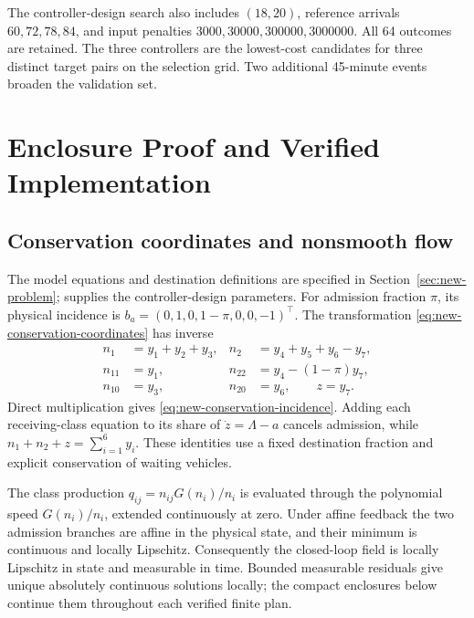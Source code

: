 The controller-design search also includes $(18,20)$, reference arrivals
$60,72,78,84$, and input penalties $3000,30000,300000,3000000$.
All 64 outcomes are retained. The three controllers are the lowest-cost candidates for three
distinct target pairs on the selection grid. Two additional 45-minute
events broaden the validation set.

\section{Enclosure Proof and Verified Implementation}
\label{app:new-enclosure-proof}

\subsection{Conservation coordinates and nonsmooth flow}

The model equations and destination definitions are specified in
Section~\ref{sec:new-problem};  supplies the controller-design
parameters. For admission fraction $\pi$, its physical incidence is
$b_a=(0,1,0,1-\pi,0,0,-1)^\top$. The transformation
\eqref{eq:new-conservation-coordinates} has inverse
\begin{equation}
 \begin{aligned}
 n_1&=y_1+y_2+y_3,&
 n_2&=y_4+y_5+y_6-y_7,\\
 n_{11}&=y_1,&n_{22}&=y_4-(1-\pi)y_7,\\
 n_{10}&=y_3,&n_{20}&=y_6,\qquad z=y_7.
 \end{aligned}
 \label{eq:new-inverse-coordinates}
\end{equation}
Direct multiplication gives \eqref{eq:new-conservation-incidence}. Adding
each receiving-class equation to its share of $\dot z=\Lambda-a$ cancels
admission, while $n_1+n_2+z=\sum_{i=1}^{6}y_i$. These identities use a fixed
destination fraction and explicit conservation of waiting vehicles.

The class production $q_{ij}=n_{ij}G(n_i)/n_i$ is evaluated through the
polynomial speed $G(n_i)/n_i$, extended continuously at zero. Under affine
feedback the two admission branches are affine in the physical state, and
their minimum is continuous and locally Lipschitz. Consequently the
closed-loop field is locally Lipschitz in state and measurable in time.
Bounded measurable residuals give unique absolutely continuous solutions
locally; the compact enclosures below continue them throughout each verified
finite plan.

